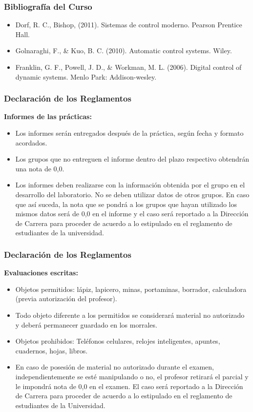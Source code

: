 \documentclass[aspectratio=169,handout]{beamer}
\theoremstyle{definition}
\theoremstyle{plain}
\theoremstyle{remark}
\begin{document}
\begin{frame}[c]\frametitle{Bibliografía del Curso}
\begin{itemize}
  \item Dorf, R. C., Bishop, (2011). Sistemas de control moderno. Pearson Prentice Hall.
  \item Golnaraghi, F., \& Kuo, B. C. (2010). Automatic control systems. Wiley.
  \item Franklin, G. F., Powell, J. D., \& Workman, M. L. (2006). Digital control of dynamic systems. Menlo Park: Addison-wesley.
\end{itemize}
\end{frame}

\begin{frame}[<+->][c]\frametitle{Declaración de los Reglamentos}
\textbf{Informes de las prácticas:}
\begin{itemize}
  \item Los informes serán entregados después de la práctica, según fecha y formato acordados.
  \item Los grupos que no entreguen el informe dentro del plazo respectivo obtendrán una nota de 0,0.
  \item Los informes deben realizarse con la información obtenida por el grupo en el desarrollo del laboratorio. No se deben utilizar datos de otros grupos. En caso que así suceda, la nota que se pondrá a los grupos que hayan utilizado los mismos datos será de 0,0 en el informe y el caso será reportado a la Dirección de Carrera para proceder de acuerdo a lo estipulado en el reglamento de estudiantes de la universidad.
\end{itemize}
\end{frame}

\begin{frame}[<+->][c]\frametitle{Declaración de los Reglamentos}
\textbf{Evaluaciones escritas:}
\begin{itemize}
  \item Objetos permitidos: lápiz, lapicero, minas, portaminas, borrador, calculadora (previa autorización del profesor).
  \item Todo objeto diferente a los permitidos se considerará material no autorizado y deberá permanecer guardado en los morrales.
  \item Objetos prohibidos: Teléfonos celulares, relojes inteligentes, apuntes, cuadernos, hojas, libros.
  \item En caso de posesión de material no autorizado durante el examen, independientemente se esté manipulando o no, el profesor retirará el parcial y le impondrá nota de 0,0 en el examen. El caso será reportado a la Dirección de Carrera para proceder de acuerdo a lo estipulado en el reglamento de estudiantes de la Universidad.
\end{itemize}
\end{frame}
\end{document}
